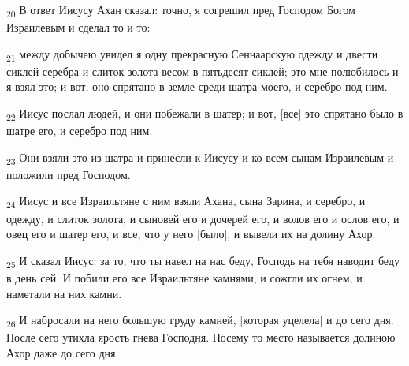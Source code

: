 \begin{tcolorbox}
\textsubscript{20} В ответ Иисусу Ахан сказал: точно, я согрешил пред Господом Богом Израилевым и сделал то и то:
\end{tcolorbox}
\begin{tcolorbox}
\textsubscript{21} между добычею увидел я одну прекрасную Сеннаарскую одежду и двести сиклей серебра и слиток золота весом в пятьдесят сиклей; это мне полюбилось и я взял это; и вот, оно спрятано в земле среди шатра моего, и серебро под ним.
\end{tcolorbox}
\begin{tcolorbox}
\textsubscript{22} Иисус послал людей, и они побежали в шатер; и вот, [все] это спрятано было в шатре его, и серебро под ним.
\end{tcolorbox}
\begin{tcolorbox}
\textsubscript{23} Они взяли это из шатра и принесли к Иисусу и ко всем сынам Израилевым и положили пред Господом.
\end{tcolorbox}
\begin{tcolorbox}
\textsubscript{24} Иисус и все Израильтяне с ним взяли Ахана, сына Зарина, и серебро, и одежду, и слиток золота, и сыновей его и дочерей его, и волов его и ослов его, и овец его и шатер его, и все, что у него [было], и вывели их на долину Ахор.
\end{tcolorbox}
\begin{tcolorbox}
\textsubscript{25} И сказал Иисус: за то, что ты навел на нас беду, Господь на тебя наводит беду в день сей. И побили его все Израильтяне камнями, и сожгли их огнем, и наметали на них камни.
\end{tcolorbox}
\begin{tcolorbox}
\textsubscript{26} И набросали на него большую груду камней, [которая уцелела] и до сего дня. После сего утихла ярость гнева Господня. Посему то место называется долиною Ахор даже до сего дня.
\end{tcolorbox}
